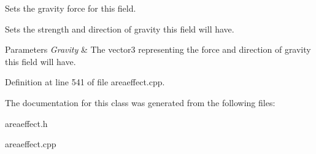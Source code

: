 Sets the gravity force for this field. 

Sets the strength and direction of gravity this field will have. 
\begin{DoxyParams}{Parameters}
{\em Gravity} & The vector3 representing the force and direction of gravity this field will have. \\
\hline
\end{DoxyParams}


Definition at line 541 of file areaeffect.cpp.



The documentation for this class was generated from the following files:\begin{DoxyCompactItemize}
\item 
areaeffect.h\item 
areaeffect.cpp\end{DoxyCompactItemize}
